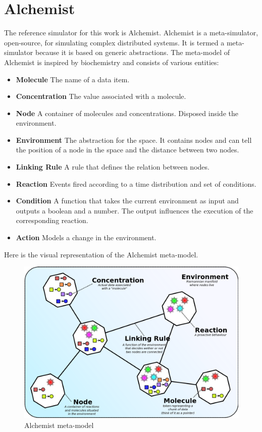 \documentclass[12pt,a4paper,openright,twoside]{book}
\begin{document}
\section{Alchemist}

The reference simulator for this work is Alchemist. \cite{Pianini_2013}
Alchemist is a meta-simulator, open-source, for simulating complex distributed systems. It is termed a meta-simulator because it is based on generic abstractions. 
The meta-model of Alchemist is inspired by biochemistry and consists of various entities:
\begin{itemize}
  \item \textbf{Molecule} The name of a data item.
  \item \textbf{Concentration} The value associated with a molecule.
  \item \textbf{Node} A container of molecules and concentrations. Disposed inside the environment.
  \item \textbf{Environment} The abstraction for the space. It contains nodes and can tell the position of a node in the space and the distance between two nodes.
  \item \textbf{Linking Rule} A rule that defines the relation between nodes.
  \item \textbf{Reaction} Events fired according to a time distribution and set of conditions.
  \item \textbf{Condition} A function that takes the current environment as input and outputs a boolean and a number. The output influences the execution of the corresponding reaction.
  \item \textbf{Action} Models a change in the environment.
\end{itemize}

Here is the visual representation of the Alchemist meta-model.

\begin{figure}[h]
  \centering
  \includegraphics[width=\textwidth]{figures/alchemist-model.png}
  \caption{Alchemist meta-model}
\end{figure}
\end{document}
